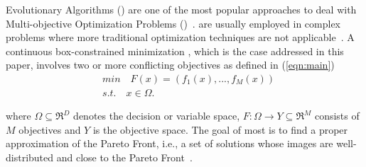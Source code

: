  Evolutionary Algorithms (\MOEAS{}) are one of the most popular approaches 
to deal with Multi-objective Optimization Problems (\MOPS{})~\cite{das2011real, zhou2011multiobjective}.
%
\MOEAS{} are usually employed in complex problems where more traditional optimization techniques are not 
applicable~\cite{Lootsma:99}.
%
A continuous box-constrained minimization \MOP{}, which is the case addressed in this paper,
involves two or more conflicting objectives as defined in (\ref{eqn:main})
%
\begin{equation}\label{eqn:main}
\begin{split}
&min \quad F(x) = (f_1(x), ..., f_M(x)) \\
&s.t. \quad x \in \Omega.
\end{split}
\end{equation}

where 
$\Omega \subseteq \Re^D$ denotes the decision or variable space, 
$F: \Omega \rightarrow Y \subseteq \Re^M$ consists of $M$ objectives and 
$Y$ is the objective space.
%
%
%
%
%
%
The goal of most \MOEAS{} is to find a proper approximation of the Pareto Front, i.e., a set of
solutions whose images are well-distributed and close to the Pareto Front~\cite{trivedi2016survey}.
%

